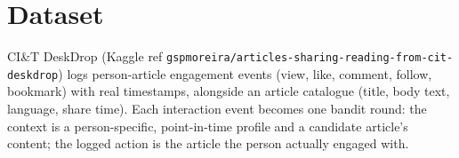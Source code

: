 \section{Dataset}
CI\&T DeskDrop (Kaggle ref
\texttt{gspmoreira/articles-sharing-reading-from-cit-deskdrop}) logs
person-article engagement events (view, like, comment, follow, bookmark)
with real timestamps, alongside an article catalogue (title, body text,
language, share time). Each interaction event becomes one bandit round:
the context is a person-specific, point-in-time profile and a candidate
article's content; the logged action is the article the person actually
engaged with.
